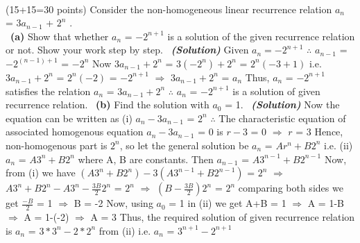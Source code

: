 \documentclass[a4 paper]{article}
\numberwithin{equation}{section}
\newcommand{\problem}[2]{~\\\fbox{\textbf{Problem #1}}\hfill (#2 points)\newline\newline}
\newcommand{\subproblem}[1]{~\newline\textbf{(#1)}}
\newcommand{\solution}{~\newline\textbf{\textit{(Solution)}} }
\newcommand{\0}{\mathbf{0}}
\begin{document}
\problem{1}{15+15=30}
Consider the non-homogeneous linear recurrence relation $a_n$ = 3$a_{n-1}$ + $2^n$ .\\
\subproblem{a} Show that whether $a_n$ = $-2^{n+1}$ is a solution of the given recurrence relation or not. Show your work step by step.
\solution
\newline
Given $a_n = -2^{n+1}$ \newline 
$\therefore$
$a_{n-1}$ = $-2^{(n-1)+1}$ = $-2^n$ \newline
Now $3a_{n-1}+2^n$ = $3(-2^n)+2^n$ = $2^n(-3+1)$ \newline
i.e. $3a_{n-1}+2^n$ = $2^n(-2)$ = $-2^{n+1}$ \newline
$\Rightarrow$ $3a_{n-1}+2^n$ = $a_n$ \newline
Thus, $a_n$ = $-2^{n+1}$ satisfies the relation $a_n$ = $3a_{n-1}+2^n$ \newline
$\therefore$ $a_n$ = $-2^{n+1}$ is a solution of given recurrence relation.
\newline
\subproblem{b} Find the solution with $a_0$ = 1.
\solution
\newline
Now the equation can be written as \newline
(i) $a_n-3a_{n-1}$ = $2^n$ \newline
$\therefore$ The characteristic equation of associated homogenous equation $a_n-3a_{n-1}$ = 0 is $r-3$ = 0 $\Rightarrow$ $r$ = 3 \newline
Hence, non-homogenous part is $2^n$, so let the general solution be \newline
$a_n$ = $Ar^n+B2^n$ \newline
i.e. (ii) $a_n$ = $A3^n+B2^n$ where A, B are constants. \newline
Then $a_{n-1}$ = $A3^{n-1}+B2^{n-1}$ \newline
Now, from (i) we have \newline
$(A3^n+B2^n)-3(A3^{n-1}+B2^{n-1})$ = $2^n$ \newline
$\Rightarrow$ $A3^n+B2^n-A3^n-\frac{3B}{2}2^n$ = $2^n$ \newline
$\Rightarrow$ $(B-\frac{3B}{2})2^n$ = $2^n$ \newline
comparing both sides we get \newline
$\frac{-B}{2}$ = 1 $\Rightarrow$ B = -2 \newline
Now, using $a_0$ = 1 in (ii) we get \newline
A+B = 1 $\Rightarrow$ A = 1-B $\Rightarrow$ A = 1-(-2) $\Rightarrow$ A = 3 \newline
Thus, the required solution of given recurrence relation is \newline
$a_n$ = $3*3^n-2*2^n$ from (ii) \newline
i.e. $a_n$ = $3^{n+1}-2^{n+1}$ \newline
\end{document}
